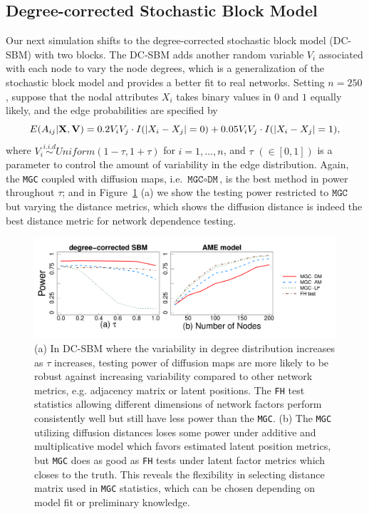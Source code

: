 \documentclass[11pt]{article}
\theoremstyle{definition}
\begin{document}
\subsection{Degree-corrected Stochastic Block Model}
Our next simulation shifts to the degree-corrected stochastic block model (DC-SBM) with two blocks. The DC-SBM adds another random variable $V_{i}$ associated with each node to vary the node degrees, which is a generalization of the stochastic block model and provides a better fit to real networks. Setting $n=250$, suppose that the nodal attributes $X_i$ takes binary values in $0$ and $1$ equally likely, and the edge probabilities are specified by  
\vspace*{-0.4cm}
\begin{equation}
E( A_{ij} | \mathbf{X}, \mathbf{V} )  = 0.2 V_{i} V_{j} \cdot I ( |X_{i} - X_{j}| = 0 ) + 0.05 V_{i} V_{j} \cdot I(|X_{i} - X_{j}| = 1),
\label{eq:tau}
\vspace*{-0.4cm}
\end{equation} 
where $V_{i} \overset{i.i.d}{\sim} Uniform(1 - \tau, 1 + \tau)$ for $i = 1, \ldots, n$, and $\tau$ $(\in [0, 1])$ is a parameter to control the amount of variability in the edge distribution. Again, the \texttt{MGC} coupled with diffusion maps, i.e. $\texttt{MGC} \circ \texttt{DM}$, is the best method in power throughout $\tau$; and in Figure~\ref{fig:combined} (a) we show the testing power restricted to $\texttt{MGC}$ but varying the distance metrics, which shows the diffusion distance is indeed the best distance metric for network dependence testing.

\begin{figure}[H]
	\centering
	\includegraphics[width=\textwidth]{amedc.pdf}
	\caption{(a) In DC-SBM where the variability in degree distribution increases as $\tau$ increases, testing power of diffusion maps are more likely to be robust against increasing variability compared to other network metrics, e.g. adjacency matrix or latent positions. The \texttt{FH} test statistics allowing different dimensions of network factors perform consistently well but still have less power than the \texttt{MGC}. (b) The \texttt{MGC} utilizing diffusion distances loses some power under additive and multiplicative model which favors estimated latent position metrics, but \texttt{MGC} does as good as \texttt{FH} tests under latent factor metrics which closes to the truth. This reveals the flexibility in selecting distance matrix used in \texttt{MGC} statistics, which can be chosen depending on model fit or preliminary knowledge.}
	\label{fig:combined}
\end{figure}	
\end{document}
